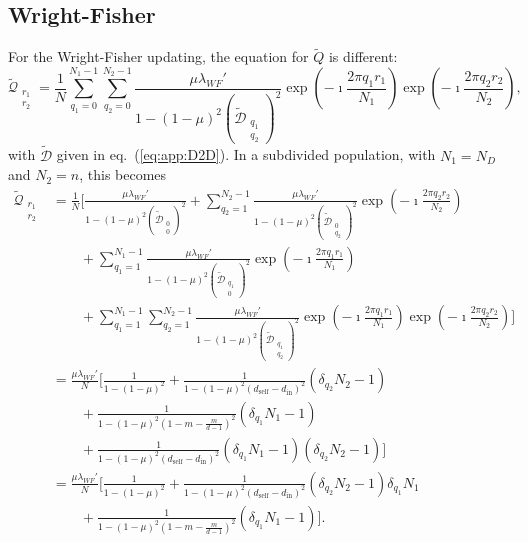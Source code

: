 \documentclass[11pt, letterpaper]{article}
\renewcommand{\eqref}[1]{\textup{{\normalfont eq.~(\ref{#1}}\normalfont)}}
\newcommand{\self}{\textrm{self}}
\newcommand{\inn}{\textrm{in}}
\newcommand{\din}{d_{\inn}}
\newcommand{\dself}{d_{\self}}
\newcommand{\ndemes}{N_D}
\begin{document}
\subsection{Wright-Fisher}
For the Wright-Fisher updating, the equation for $\tilde{Q}$ is different:
\begin{equation}
\tilde{\mathcal{Q}}_{\substack{r_1\\r_2}} = \frac{1}{N} \sum_{q_1=0}^{N_1-1} \sum_{q_2=0}^{N_2 -1} \frac{\mu \lambda_{WF}'}{1-(1-\mu)^2 (\tilde{\mathcal{D}}_{\substack{q_1\\q_2}})^2} \exp\left(-\imath \frac{2\pi q_1 r_1}{N_1}\right)\exp\left(-\imath \frac{2\pi q_2 r_2}{N_2}\right), 
\end{equation}
with $\tilde{\mathcal{D}}$ given in \eqref{eq:app:D2D}. In a subdivided population, with $N_1 = \ndemes$ and $N_2 = n$, this becomes
\begin{align}
\tilde{\mathcal{Q}}_{\substack{r_1\\r_2}} 
%
& = \frac{1}{N} \Bigg[ 
\frac{\mu \lambda_{WF}'}{1-(1-\mu)^2 (\tilde{\mathcal{D}}_{\substack{0\\0}})^2} 
+ \sum_{q_2=1}^{N_2-1} \frac{\mu \lambda_{WF}'}{1-(1-\mu)^2 (\tilde{\mathcal{D}}_{\substack{0\\q_2}})^2} \exp\left(-\imath \frac{2\pi q_2 r_2}{N_2}\right) \nonumber \\
& \qquad + \sum_{q_1=1}^{N_1-1} \frac{\mu \lambda_{WF}'}{1-(1-\mu)^2 (\tilde{\mathcal{D}}_{\substack{q_1\\0}})^2} \exp\left(-\imath \frac{2\pi q_1 r_1}{N_1}\right)  \nonumber \\
& \qquad + \sum_{q_1=1}^{N_1-1} \sum_{q_2=1}^{N_2 -1} \frac{\mu \lambda_{WF}'}{1-(1-\mu)^2 (\tilde{\mathcal{D}}_{\substack{q_1\\q_2}})^2} \exp\left(-\imath \frac{2\pi q_1 r_1}{N_1}\right)\exp\left(-\imath \frac{2\pi q_2 r_2}{N_2}\right)
 \Bigg] \nonumber\\
& = \frac{\mu \lambda_{WF}'}{N} \Bigg[ 
\frac{1}{1-(1-\mu)^2 } 
%
+ \frac{1}{1-(1-\mu)^2 (\dself - \din)^2} (\delta_{q_2} N_2 - 1) \nonumber \\
%
& \qquad +  \frac{1}{1-(1-\mu)^2 (1-m-\frac{m}{d-1})^2} (\delta_{q_1} N_1 - 1) \nonumber \\
%
& \qquad +  \frac{1}{1-(1-\mu)^2 (\dself - \din)^2} (\delta_{q_1} N_1 - 1)(\delta_{q_2} N_2 - 1)
 \Bigg] \nonumber\\
& = \frac{\mu \lambda_{WF}'}{N} \Bigg[ 
\frac{1}{1-(1-\mu)^2 } 
%
+ \frac{1}{1-(1-\mu)^2 (\dself - \din)^2} (\delta_{q_2} N_2 - 1) \delta_{q_1} N_1 \nonumber \\
%
& \qquad +  \frac{1}{1-(1-\mu)^2 (1-m-\frac{m}{d-1})^2} (\delta_{q_1} N_1 - 1) 
\Bigg] . \label{eq:app:Q2DWFsol}
\end{align}
\end{document}
